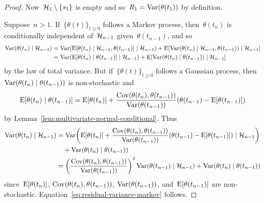 \documentclass[11pt,oneside]{article}
\begin{document}
\begin{proof}
    Now~$\mathcal{H}_1\setminus\{s_1\}$ is empty and so~$R_1=\operatorname{Var}(\theta(t_1))$ by definition.

    Suppose~$n>1$.
    If~$\{\theta(t)\}_{t\ge0}$ follows a Markov process, then~$\theta(t_n)$ is conditionally independent of~$\mathcal{H}_{n-1}$ given~$\theta(t_{n-1})$, and so
    \begin{align*}
        \operatorname{Var}(\theta(t_n)\mid\mathcal{H}_{n-1})
        &= \operatorname{Var}(\operatorname{E}[\theta(t_n)\mid\mathcal{H}_{n-1},\theta(t_{n-1})]\mid\mathcal{H}_{n-1})+\operatorname{E}[\operatorname{Var}(\theta(t_n)\mid\mathcal{H}_{n-1},\theta(t_{n-1}))\mid\mathcal{H}_{n-1}] \\
        &= \operatorname{Var}(\operatorname{E}[\theta(t_n)\mid\theta(t_{n-1})]\mid\mathcal{H}_{n-1})+\operatorname{E}[\operatorname{Var}(\theta(t_n)\mid\theta(t_{n-1}))\mid\mathcal{H}_{n-1}]
    \end{align*}
    by the law of total variance.
    But if~$\{\theta(t)\}_{t\ge0}$ follows a Gaussian process, then~$\operatorname{Var}(\theta(t_n)\mid\theta(t_{n-1}))$ is non-stochastic and
    \[ \operatorname{E}[\theta(t_n)\mid\theta(t_{n-1})]=\operatorname{E}[\theta(t_n)]+\frac{\operatorname{Cov}(\theta(t_n),\theta(t_{n-1}))}{\operatorname{Var}(\theta(t_{n-1}))}(\theta(t_{n-1})-\operatorname{E}[\theta(t_{n-1})]) \]
    by Lemma~\ref{lem:multivariate-normal-conditional}.
    Thus
    \begin{align*}
        \Var(\theta(t_n)\mid\Hcal_{n-1})
        &= \Var\left(\E[\theta(t_n)]+\frac{\Cov(\theta(t_n),\theta(t_{n-1}))}{\Var(\theta(t_{n-1}))}(\theta(t_{n-1})-\E[\theta(t_{n-1})])\mid\Hcal_{n-1}\right) \\
        &\quad +\Var(\theta(t_n)\mid\theta(t_{n-1})) \\
        &= \left(\frac{\Cov(\theta(t_n),\theta(t_{n-1}))}{\Var(\theta(t_{n-1}))}\right)^2\Var(\theta(t_{n-1})\mid\Hcal_{n-1})+\Var(\theta(t_n)\mid\theta(t_{n-1}))
    \end{align*}
    since~$\operatorname{E}[\theta(t_n)]$, $\operatorname{Cov}(\theta(t_n),\theta(t_{n-1}))$, $\operatorname{Var}(\theta(t_{n-1}))$, and~$\operatorname{E}[\theta(t_{n-1})]$ are non-stochastic.
    Equation~\eqref{eq:residual-variance-markov} follows.


\end{proof}
\end{document}
